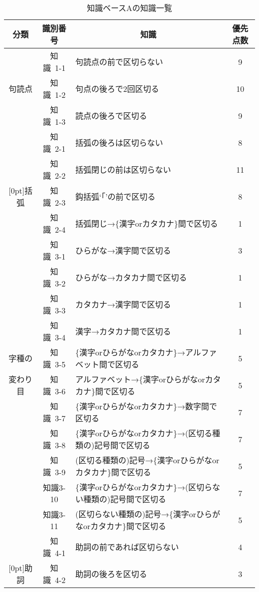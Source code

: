 \begin{table}[bt]
\caption{知識ベースAの知識一覧}
\label{知識ベースAの知識一覧}
\hspace*{-3ex}
\footnotesize
\begin{tabular}{|c|c|p{72ex}|c|} \hline
分類 & 識別番号 & \multicolumn{1}{|c|}{知識} & {\small 優先点数} \\ \hline \hline
	&知識~1-1 & 句読点の前で区切らない & 9 \\ \cline{2-4}
句読点	&知識~1-2 & 句点の後ろで2回区切る & 10 \\ \cline{2-4}
	&知識~1-3 & 読点の後ろで区切る & 9 \\ \hline
	&知識~2-1 & 括弧の後ろは区切らない & 8 \\ \cline{2-4}
	&知識~2-2 & 括弧閉じの前は区切らない & 11 \\ \cline{2-4}
\raisebox{1.5ex}[0pt]{括弧}
	&知識~2-3 & 鈎括弧`「'の前で区切る & 8 \\ \cline{2-4}
	&知識~2-4 & 括弧閉じ→\{漢字orカタカナ\}間で区切る  & 1 \\ \hline
	&知識~3-1 & ひらがな→漢字間で区切る & 3 \\ \cline{2-4}
	&知識~3-2 & ひらがな→カタカナ間で区切る & 1 \\ \cline{2-4}
	&知識~3-3 & カタカナ→漢字間で区切る & 1 \\ \cline{2-4}
	&知識~3-4 & 漢字→カタカナ間で区切る & 1 \\ \cline{2-4}
字種の	&知識~3-5 & \{漢字orひらがなorカタカナ\}→アルファベット間で区切る 
		& 5 \\ \cline{2-4}
変わり目&知識~3-6 & アルファベット→\{漢字orひらがなorカタカナ\}間で区切る 
		& 5 \\ \cline{2-4}
	&知識~3-7 & \{漢字orひらがなorカタカナ\}→数字間で区切る & 7 \\ \cline{2-4}
	&知識~3-8 & \{漢字orひらがなorカタカナ\}→(区切る種類の)記号間で区切る 
		& 7 \\ \cline{2-4}
	&知識~3-9 & (区切る種類の)記号→\{漢字orひらがなorカタカナ\}間で区切る 
		& 5 \\ \cline{2-4}
	&知識3-10 & \{漢字orひらがなorカタカナ\}→(区切らない種類の)記号間で区切る 
		& 7 \\ \cline{2-4}
	&知識3-11 & (区切らない種類の)記号→\{漢字orひらがなorカタカナ\}間で区切る 
		& 5 \\ \hline
	&知識~4-1 & 助詞の前であれば区切らない & 4 \\ \cline{2-4}
\raisebox{1.5ex}[0pt]{助詞}
	&知識~4-2 & 助詞の後ろを区切る & 3 \\ \hline

\end{tabular}
\end{table}
